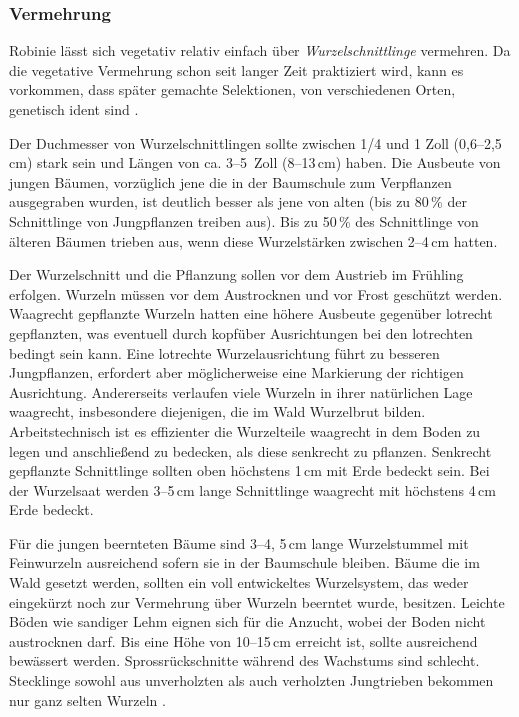 \documentclass[twocolumn]{scrartcl}
\begin{document}
\subsubsection{Vermehrung}

Robinie lässt sich vegetativ relativ einfach über
\emph{Wurzelschnittlinge} vermehren. Da die vegetative Vermehrung
schon seit langer Zeit praktiziert wird, kann es vorkommen, dass
später gemachte Selektionen, von verschiedenen Orten, genetisch ident
sind \citep{liesebach2012robinie}.

Der Duchmesser von Wurzelschnittlingen sollte zwischen 1/4 und 1 Zoll
(0,6--2,5\,cm) stark sein und Längen von ca. 3--5~Zoll (8--13\,cm)
haben. Die Ausbeute von jungen Bäumen, vorzüglich jene die in der
Baumschule zum Verpflanzen ausgegraben wurden, ist deutlich besser als
jene von alten (bis zu 80\,\% der Schnittlinge von Jungpflanzen
treiben aus). Bis zu 50\,\% des Schnittlinge von älteren Bäumen
trieben aus, wenn diese Wurzelstärken zwischen 2--4\,cm hatten.

Der Wurzelschnitt und die Pflanzung sollen vor dem Austrieb im Frühling
erfolgen. Wurzeln müssen vor dem Austrocknen und vor Frost geschützt
werden. Waagrecht gepflanzte Wurzeln hatten eine höhere Ausbeute
gegenüber lotrecht gepflanzten, was eventuell durch kopfüber
Ausrichtungen bei den lotrechten bedingt sein kann. Eine lotrechte
Wurzelausrichtung führt zu besseren Jungpflanzen, erfordert aber
möglicherweise eine Markierung der richtigen Ausrichtung. Andererseits
verlaufen viele Wurzeln in ihrer natürlichen Lage waagrecht,
insbesondere diejenigen, die im Wald Wurzelbrut
bilden. Arbeitstechnisch ist es effizienter die Wurzelteile waagrecht
in dem Boden zu legen und anschließend zu bedecken, als diese
senkrecht zu pflanzen. Senkrecht gepflanzte Schnittlinge sollten oben
höchstens 1\,cm mit Erde bedeckt sein. Bei der Wurzelsaat werden
3--5\,cm lange Schnittlinge waagrecht mit höchstens 4\,cm Erde
bedeckt.

Für die jungen beernteten Bäume sind 3--4, 5\,cm lange Wurzelstummel
mit Feinwurzeln ausreichend sofern sie in der Baumschule
bleiben. Bäume die im Wald gesetzt werden, sollten ein voll
entwickeltes Wurzelsystem, das weder eingekürzt noch zur Vermehrung
über Wurzeln beerntet wurde, besitzen.  Leichte Böden wie sandiger
Lehm eignen sich für die Anzucht, wobei der Boden nicht austrocknen
darf.  Bis eine Höhe von 10--15\,cm erreicht ist, sollte ausreichend
bewässert werden.  Sprossrückschnitte während des Wachstums sind
schlecht. Stecklinge sowohl aus unverholzten als auch verholzten
Jungtrieben bekommen nur ganz selten Wurzeln
\citep{swingle1937robinie,redei2001robinieVermehrung,redei2005robinieVermehrung}.
\end{document}
